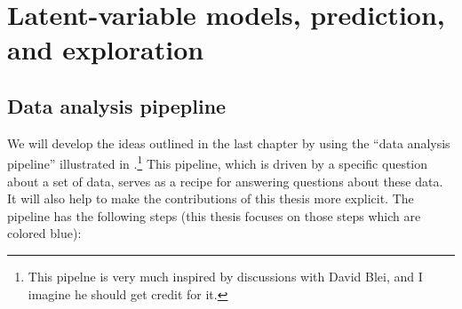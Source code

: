 \label{sec:pipeline}

\section{Latent-variable models, prediction, and exploration}

\subsection{Data analysis pipepline}
\label{sec:data_analysis_pipeline}
We will develop the ideas outlined in the last chapter by using the
``data analysis pipeline'' illustrated in
.\footnote{This pipelne is very much
  inspired by discussions with David Blei, and I imagine he should get
  credit for it.} This pipeline, which is driven by a specific question
about a set of data, serves as a recipe for answering questions about
these data.  It will also help to make the contributions of this
thesis more explicit. The pipeline has the following steps (this
thesis focuses on those steps which are colored blue):

